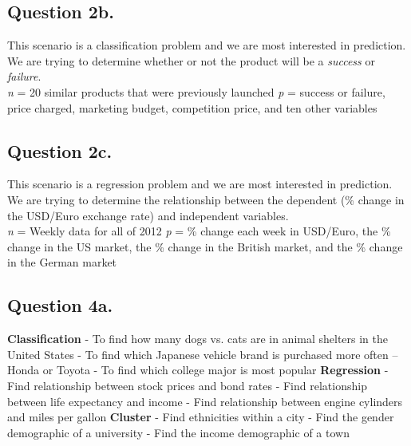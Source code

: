 \documentclass{article}
\begin{document}
\subsection*{Question 2b.}
This scenario is a classification problem and we are most interested in prediction. We are trying to determine whether or not the product will be a \textit{success} or \textit{failure}. \\
\newline
\textit{n} = 20 similar products that were previously launched \newline
\textit{p} = success or failure, price charged, marketing budget, competition price, and ten other variables 

\subsection*{Question 2c.}
This scenario is a regression problem and we are most interested in prediction. We are trying to determine the relationship between the dependent (\% change in the USD/Euro exchange rate) and independent variables. \\
\newline
\textit{n} = Weekly data for all of 2012 \newline
\textit{p} = \% change each week in USD/Euro, the \% change in the US market, the \% change in the British market, and the \% change in the German market

\subsection*{Question 4a.}
\textbf{Classification} \newline
- To find how many dogs vs. cats are in animal shelters in the United States \newline
- To find which Japanese vehicle brand is purchased more often -- Honda or Toyota \newline
- To find which college major is most popular \newline
\textbf{Regression} \newline
- Find relationship between stock prices and bond rates \newline
- Find relationship between life expectancy and income \newline
- Find relationship between engine cylinders and miles per gallon \newline
\textbf{Cluster} \newline
- Find ethnicities within a city \newline
- Find the gender demographic of a university \newline
- Find the income demographic of a town \newline
\end{document}
